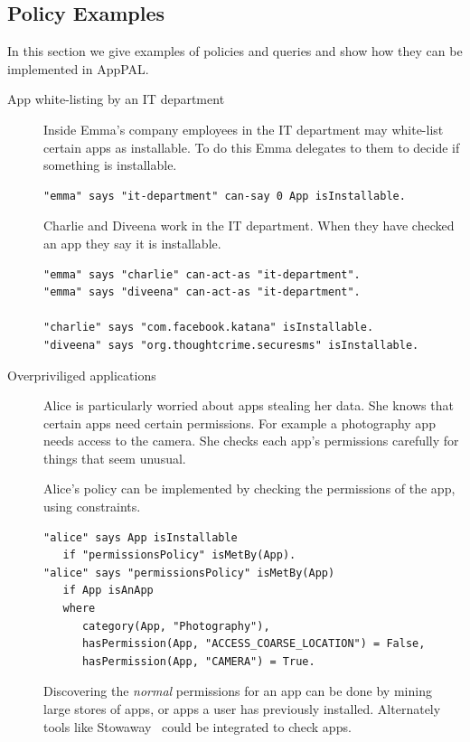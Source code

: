 \documentclass[a4paper]{scrartcl}
\begin{document}
\subsection{Policy Examples}
\label{ssec:idioms}

In this section we give examples of policies and queries and show how they can be implemented in AppPAL.

\begin{description}
  \item[App white-listing by an IT department]
    Inside Emma's company employees in the IT department may white-list certain apps as installable.
    To do this Emma delegates to them to decide if something is installable.
    \begin{lstlisting}
"emma" says "it-department" can-say 0 App isInstallable.
    \end{lstlisting}
    Charlie and Diveena work in the IT department.
    When they have checked an app they say it is installable.
    \begin{lstlisting}
"emma" says "charlie" can-act-as "it-department".
"emma" says "diveena" can-act-as "it-department".

"charlie" says "com.facebook.katana" isInstallable.
"diveena" says "org.thoughtcrime.securesms" isInstallable.
    \end{lstlisting}

  \item[Overpriviliged applications]
    Alice is particularly worried about apps stealing her data.
    She knows that certain apps need certain permissions.
    For example a photography app needs access to the camera.
    She checks each app's permissions carefully for things that seem unusual.

    Alice's policy can be implemented by checking the permissions of the app, using constraints.
    \begin{lstlisting}
"alice" says App isInstallable
   if "permissionsPolicy" isMetBy(App).
"alice" says "permissionsPolicy" isMetBy(App)
   if App isAnApp
   where
      category(App, "Photography"),
      hasPermission(App, "ACCESS_COARSE_LOCATION") = False,
      hasPermission(App, "CAMERA") = True.
    \end{lstlisting}

    Discovering the \emph{normal} permissions for an app can be done by mining large stores of apps, or apps a user has previously installed.
    Alternately tools like Stowaway~\citep{Felt:2011kj} could be integrated to check apps.


\end{description}
\end{document}
